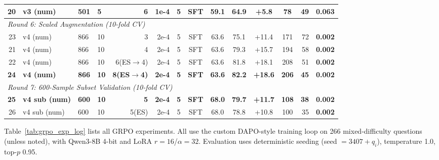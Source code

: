 \begin{table}[t]
{\begin{tabular}{rlllrrccccccrr}
20  & v3 (num)         & 501 & 5  & 6        & 1e-4   & 5   & SFT    & 59.1 & 64.9 & +5.8  & 78  & 49 & 0.063 \\
\midrule
\multicolumn{14}{l}{\textit{Round 6: Scaled Augmentation (10-fold CV)}} \\
23  & v4 (num)         & 866 & 10 & 3        & 2e-4   & 5   & SFT    & 63.6 & 75.1 & +11.4 & 171 & 72 & \textbf{0.002} \\
21  & v4 (num)         & 866 & 10 & 4        & 2e-4   & 5   & SFT    & 63.6 & 79.3 & +15.7 & 194 & 58 & \textbf{0.002} \\
22  & v4 (num)         & 866 & 10 & 6(ES$\to$4) & 2e-4 & 5  & SFT    & 63.6 & 81.8 & +18.1 & 208 & 51 & \textbf{0.002} \\
\textbf{24} & \textbf{v4 (num)} & \textbf{866} & \textbf{10} & \textbf{8(ES$\to$4)} & \textbf{2e-4} & \textbf{5} & \textbf{SFT} & \textbf{63.6} & \textbf{82.2} & \textbf{+18.6} & \textbf{206} & \textbf{45} & \textbf{0.002} \\
\midrule
\multicolumn{14}{l}{\textit{Round 7: 600-Sample Subset Validation (10-fold CV)}} \\
\textbf{25} & \textbf{v4 sub (num)} & \textbf{600} & \textbf{10} & \textbf{5} & \textbf{2e-4} & \textbf{5} & \textbf{SFT} & \textbf{68.0} & \textbf{79.7} & \textbf{+11.7} & \textbf{108} & \textbf{38} & \textbf{0.002} \\
26  & v4 sub (num)     & 600 & 10 & 5(ES)    & 2e-4   & 5   & SFT    & 68.0 & 78.8 & +10.8 & 100 & 35 & \textbf{0.002} \\
\bottomrule
\end{tabular}%
}
\end{table}

Table~\ref{tab:grpo_exp_log} lists all GRPO experiments. All use the custom DAPO-style training loop on 266 mixed-difficulty questions (unless noted), with Qwen3-8B 4-bit and LoRA $r=16$/$\alpha=32$. Evaluation uses deterministic seeding (seed $=3407+q_i$), temperature 1.0, top-$p$ 0.95.

